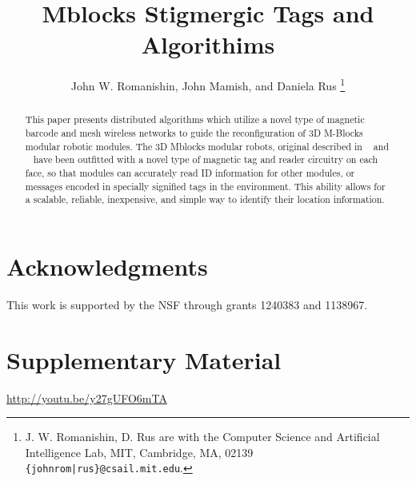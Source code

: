 \documentclass[letterpaper, 10 pt, conference]{ieeeconf}
\title{\LARGE \bf Mblocks Stigmergic Tags and Algorithims}
\author{John W. Romanishin, John Mamish, and Daniela Rus
  \thanks{J. W. Romanishin, D. Rus are with the Computer Science
    and Artificial Intelligence Lab, MIT, Cambridge, MA, 02139
    {\tt\small \{johnrom|rus\}@csail.mit.edu}.}
}
\begin{document}
\captionsetup[figure]{labelfont=small, textfont=small}
\captionsetup[table]{labelfont=small, textfont=small}

\maketitle

\thispagestyle{empty}
\pagestyle{empty}

\begin{abstract}

This paper presents distributed algorithms which utilize a novel type of magnetic barcode and mesh wireless networks to guide the reconfiguration of 3D M-Blocks modular robotic modules. The 3D Mblocks modular robots, original described in ~\cite{RomanishinRus-IROS13} and ~\cite{RomanishinRus-IROS13} have been outfitted with a novel type of magnetic tag and reader circuitry on each face, so that modules can accurately read ID information for other modules, or messages encoded in specially signified tags in the environment. This ability allows for a scalable, reliable, inexpensive, and simple way to identify their location information.

\end{abstract}













\section*{Acknowledgments}
This work is supported by the NSF through grants 1240383 and 1138967.
\section*{Supplementary Material}
\url{http://youtu.be/y27gUFO6mTA}




\end{document}
